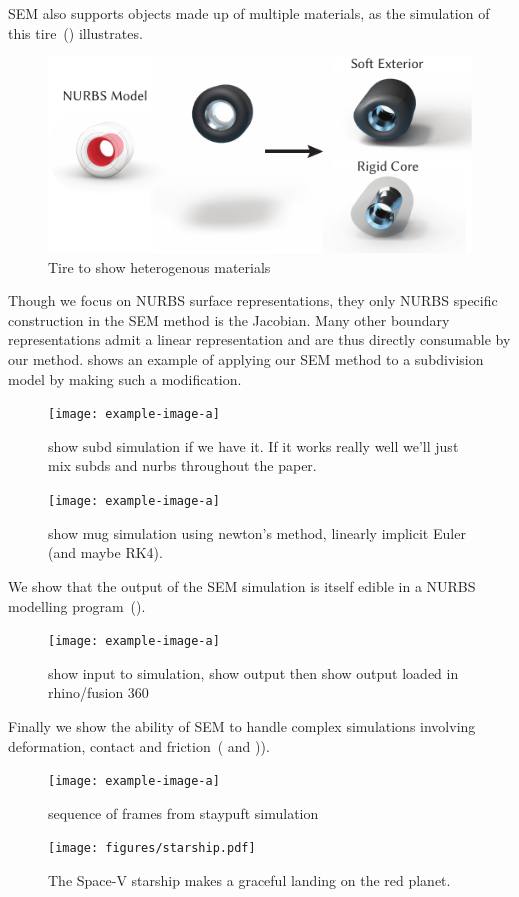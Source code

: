 SEM also supports objects made up of multiple materials, as the simulation of this tire~() illustrates.
\begin{figure}[h]
  \includegraphics[width=\columnwidth]{figures/tire}
  \caption{Tire to show heterogenous materials}
  \label{fig:tire}
\end{figure}


Though we focus on NURBS surface representations, they only NURBS specific construction in the SEM method is the Jacobian.
Many other boundary representations admit a linear representation and are thus directly consumable by our method.
 shows an example of applying our SEM method to a subdivision model by making such a modification.
\begin{figure}[h]
  \texttt{[image: example-image-a]}
  \caption{show subd simulation if we have it. If it works really well we'll just mix subds and nurbs throughout the paper. }
  \label{fig:subd}
\end{figure}

\begin{figure}[h]
  \texttt{[image: example-image-a]}
  \caption{show mug simulation using newton's method, linearly implicit Euler (and maybe RK4). }
  \label{fig:time_integration}
\end{figure}

We show that the output of the SEM simulation is itself edible in a NURBS modelling program~().
\begin{figure}[h]
  \texttt{[image: example-image-a]}
  \caption{show input to simulation, show output then show output loaded in rhino/fusion 360 }
  \label{fig:edit}
\end{figure}

Finally we show the ability of SEM to handle complex simulations involving deformation, contact and friction~( and )).
\begin{figure}[htp]
  \texttt{[image: example-image-a]}
  \caption{sequence of frames from staypuft simulation}
  \label{fig:staypuft}
\end{figure}

\begin{figure}[htp]
  \texttt{[image: figures/starship.pdf]}
  \caption{The Space-V starship makes a graceful landing on the red planet. }
  \label{fig:f1}
\end{figure}
